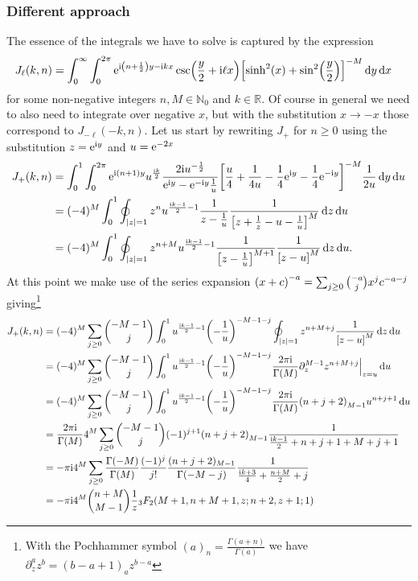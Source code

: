 \documentclass[english, parskip=full]{scrartcl}
\begin{document}
\subsubsection{Different approach}
The essence of the integrals we have to solve is captured by the expression
\begin{align}
J_\ell(k,n) &= \intx{0}{\infty}{\intx{0}{2\pi}{\powe{\i \kla*{n + \frac{1}{2}}y - \i kx} \csc\kla*{\frac{y}{2} + \i\ell x} \klb*{\sinh^2(x) + \sin^2\kla*{\frac{y}{2}}}^{-M}}{y} }{x}
\end{align}
for some non-negative integers $n,M\in\mathbb{N}_0$ and $k\in\mathbb{R}$.
Of course in general we need to also need to integrate over  negative $x$, but with the substitution $x\rightarrow -x$ those correspond to $J_{-\ell}(-k,n)$.
Let us start by rewriting $J_+$ for $n\ge 0$ using the substitution $z = \powe{\i y}$ and $u = \powe{-2x}$
\begin{align}
J_+(k,n) &= \intx{0}{1}{\intx{0}{2\pi}{ \powe{\i (n+1) y} u^\frac{\i k}{2} \frac{2\i u^{-\frac{1}{2}}}{\powe{\i y} - \powe{-\i y} \frac{1}{u}} \klb*{\frac{u}{4} + \frac{1}{4u} - \frac{1}{4}\powe{\i y} - \frac{1}{4} \powe{-\i y}}^{-M} \frac{1}{2u} }{y}}{u}\\
&= (-4)^M \intx{0}{1}{\oint_{|z|=1} z^n u^{\frac{\i k - 1}{2}-1} \frac{1}{z - \frac{1}{u}} \frac{1}{\klb*{z + \frac{1}{z} - u - \frac{1}{u}}^M}\,\d z }{u}\\
&= (-4)^M \intx{0}{1}{\oint_{|z|=1} z^{n+M} u^{\frac{\i k - 1}{2}-1} \frac{1}{\klb*{z - \frac{1}{u}}^{M+1}} \frac{1}{\klb*{z - u}^M}\,\d z }{u}.
\end{align}
At this point we make use of the series expansion $\kla*{x + c}^{-a} = \sum_{j\ge 0} \binom{-a}{j} x^j c^{-a-j}$ giving\footnote{With the Pochhammer symbol $(a)_n = \frac{\Gamma(a+n)}{\Gamma(a)}$ we have $\partial_z^a z^b = (b-a+1)_a z^{b-a}$}
\begin{align}
J_+(k,n) &= (-4)^M \sum_{j\ge 0} \binom{-M-1}{j} \intx{0}{1}{ u^{\frac{\i k - 1}{2} - 1} \kla*{-\frac{1}{u}}^{-M-1-j} \oint_{|z|=1} z^{n+M+j} \frac{1}{\klb*{z - u}^M} \,\d z}{u}\\
&= (-4)^M \sum_{j\ge 0} \binom{-M-1}{j} \intx{0}{1}{ u^{\frac{\i k - 1}{2} - 1} \kla*{-\frac{1}{u}}^{-M-1-j} \frac{2\pi\i}{\Gamma(M)} \partial_z^{M-1} z^{n+M+j} \Big\vert_{z=u}}{u}\\
&= (-4)^M \sum_{j\ge 0} \binom{-M-1}{j} \intx{0}{1}{ u^{\frac{\i k - 1}{2} - 1} \kla*{-\frac{1}{u}}^{-M-1-j} \frac{2\pi\i}{\Gamma(M)} \kla*{n+j+2}_{M-1} u^{n+j+1} }{u}\\
&= \frac{2\pi\i}{\Gamma(M)} 4^M \sum_{j\ge 0} \binom{-M-1}{j} (-1)^{j+1} \kla*{n+j+2}_{M-1} \frac{1}{\frac{\i k - 1}{2} + n+j+1 + M+j+1}\\
&= -\pi\i 4^M \sum_{j\ge 0} \frac{\Gamma(-M)}{\Gamma(M)} \frac{(-1)^j}{j!} \frac{(n+j+2)_{M-1}}{\Gamma(-M-j)} \frac{1}{\frac{\i k + 3}{4} + \frac{n+M}{2} + j}\\
&= -\pi\i 4^M \binom{n+M}{M-1} \frac{1}{z} {}_3F_2\kla*{M+1, n+M+1, z; n+2, z+1; 1}
\end{align}
\end{document}
